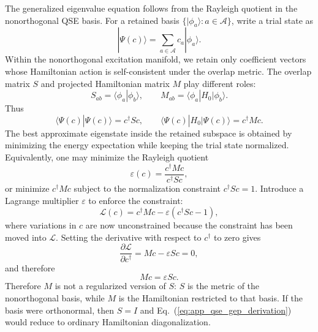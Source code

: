 \documentclass[
  reprint,
  amsmath,
  amssymb,
  aps,
  pra,
  nofootinbib,
  superscriptaddress,
  floatfix
]{revtex4-2}
\newcommand{\Acal}{\mathcal{A}}
\newcommand{\ket}[1]{|#1\rangle}
\newcommand{\bra}[1]{\langle #1|}
\newcommand{\braket}[2]{\langle #1|#2\rangle}
\begin{document}
The generalized eigenvalue equation follows from the Rayleigh quotient in the nonorthogonal QSE basis.  For a retained basis $\{\ket{\phi_a}:a\in\Acal\}$, write a trial state as
\begin{equation}
\ket{\Psi(c)}
=
\sum_{a\in\Acal}c_a\ket{\phi_a}.
\label{eq:app_qse_trial_state}
\end{equation}
Within the nonorthogonal excitation manifold, we retain only coefficient vectors whose Hamiltonian action is self-consistent under the overlap metric.
The overlap matrix $S$ and projected Hamiltonian matrix $M$ play different roles:
\begin{equation}
S_{ab}=\braket{\phi_a}{\phi_b},
\qquad
M_{ab}=\bra{\phi_a}H_0\ket{\phi_b}.
\label{eq:app_qse_sm_def}
\end{equation}
Thus
\begin{equation}
\braket{\Psi(c)}{\Psi(c)}
=c^\dagger S c,
\qquad
\bra{\Psi(c)}H_0\ket{\Psi(c)}
=c^\dagger M c.
\label{eq:app_qse_norm_energy}
\end{equation}
The best approximate eigenstate inside the retained subspace is obtained by minimizing the energy expectation while keeping the trial state normalized.  Equivalently, one may minimize the Rayleigh quotient
\begin{equation}
\varepsilon(c)
=
\frac{c^\dagger M c}{c^\dagger S c},
\label{eq:app_qse_rayleigh}
\end{equation}
or minimize $c^\dagger M c$ subject to the normalization constraint $c^\dagger S c=1$.  Introduce a Lagrange multiplier $\varepsilon$ to enforce the constraint:
\begin{equation}
\mathcal L(c)
=
c^\dagger M c-\varepsilon(c^\dagger S c-1),
\label{eq:app_qse_lagrangian}
\end{equation}
where variations in $c$ are now unconstrained because the constraint has been moved into $\mathcal L$.  Setting the derivative with respect to $c^\dagger$ to zero gives
\begin{equation}
\frac{\partial\mathcal L}{\partial c^\dagger}
=
Mc-\varepsilon Sc
=0,
\label{eq:app_qse_lagrange_stationarity}
\end{equation}
and therefore
\begin{equation}
M c=\varepsilon S c.
\label{eq:app_qse_gep_derivation}
\end{equation}
Therefore $M$ is not a regularized version of $S$: $S$ is the metric of the nonorthogonal basis, while $M$ is the Hamiltonian restricted to that basis.  If the basis were orthonormal, then $S=I$ and Eq.~(\ref{eq:app_qse_gep_derivation}) would reduce to ordinary Hamiltonian diagonalization.
\end{document}

